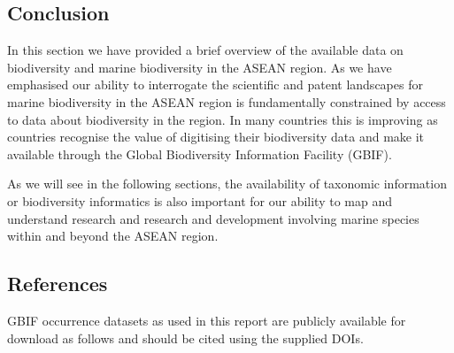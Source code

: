 \documentclass[openany]{book}
\theoremstyle{definition}
\theoremstyle{definition}
\theoremstyle{definition}
\theoremstyle{remark}
\begin{document}
\hypertarget{conclusion}{%
\subsection{Conclusion}\label{conclusion}}

In this section we have provided a brief overview of the available data
on biodiversity and marine biodiversity in the ASEAN region. As we have
emphasised our ability to interrogate the scientific and patent
landscapes for marine biodiversity in the ASEAN region is fundamentally
constrained by access to data about biodiversity in the region. In many
countries this is improving as countries recognise the value of
digitising their biodiversity data and make it available through the
Global Biodiversity Information Facility (GBIF).

As we will see in the following sections, the availability of taxonomic
information or biodiversity informatics is also important for our
ability to map and understand research and research and development
involving marine species within and beyond the ASEAN region.

\hypertarget{references}{%
\subsection{References}\label{references}}

GBIF occurrence datasets as used in this report are publicly available
for download as follows and should be cited using the supplied DOIs.
\end{document}
